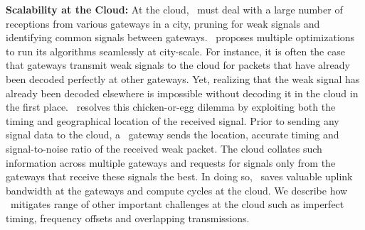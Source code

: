 

\noindent \textbf{Scalability at the Cloud:} At the cloud, \name\ must deal with a large number of receptions from various gateways in a city, pruning for weak signals and identifying common signals between gateways. \name\ proposes multiple optimizations to run its algorithms seamlessly at city-scale. For instance, it is often the case that gateways transmit weak signals to the cloud for packets that have already been decoded perfectly at other gateways. Yet, realizing that the weak signal has already been decoded elsewhere is impossible without decoding it in the cloud in the first place. \name\ resolves this chicken-or-egg dilemma by exploiting both the timing and geographical location of the received signal. Prior to sending any signal data to the cloud, a \name\ gateway sends the location, accurate timing and signal-to-noise ratio of the received weak packet. The cloud collates such information across multiple gateways and requests for signals only from the gateways that receive these signals the best. In doing so, \name\ saves valuable uplink bandwidth at the gateways and compute cycles at the cloud. We describe how \name\ mitigates  range of other important challenges at the cloud such as imperfect timing, frequency offsets and overlapping transmissions. 



